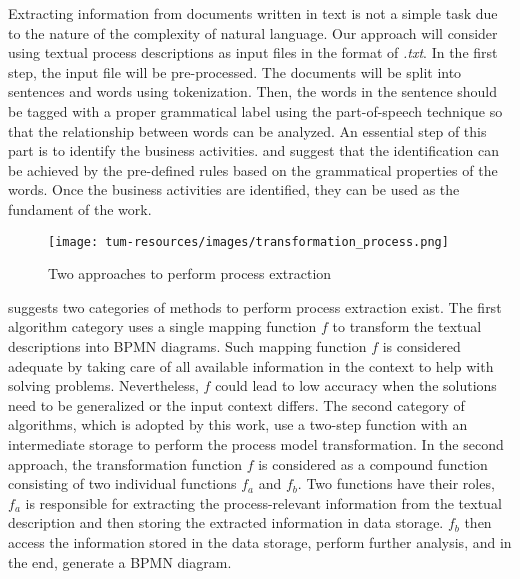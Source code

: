 Extracting information from documents written in text is not a simple task due to the nature of the complexity of natural language. Our approach will consider using textual process descriptions as input files in the format of \textit{.txt}. In the first step, the input file will be pre-processed. The documents will be split into sentences and words using tokenization. Then, the words in the sentence should be tagged with a proper grammatical label using the part-of-speech technique so that the relationship between words can be analyzed. An essential step of this part is to identify the business activities. \cite{t2m_5} and \cite{complement_1} suggest that the identification can be achieved by the pre-defined rules based on the grammatical properties of the words. Once the business activities are identified, they can be used as the fundament of the work.

\begin{figure}[h]
    \centering
    \caption{Two approaches to perform process extraction}
    \texttt{[image: tum-resources/images/transformation\_process.png]}
\end{figure}

\cite{literature_review_5} suggests two categories of methods to perform process extraction exist. The first algorithm category uses a single mapping function $f$ to transform the textual descriptions into BPMN diagrams. Such mapping function $f$ is considered adequate by taking care of all available information in the context to help with solving problems. Nevertheless, $f$ could lead to low accuracy when the solutions need to be generalized or the input context differs. The second category of algorithms, which is adopted by this work, use a two-step function with an intermediate storage to perform the process model transformation. In the second approach, the transformation function $f$ is considered as a compound function consisting of two individual functions $ f_a $ and $ f_b $. Two functions have their roles, $ f_a $ is responsible for extracting the process-relevant information from the textual description and then storing the extracted information in data storage. $ f_b $ then access the information stored in the data storage, perform further analysis, and in the end, generate a BPMN diagram.

